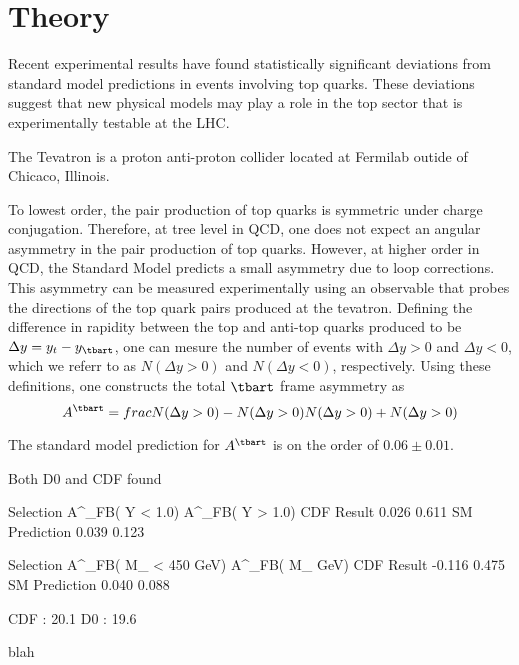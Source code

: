 
%
\section{Theory}








Recent experimental results have found statistically significant deviations from standard model predictions in events involving top quarks.
These deviations suggest that new physical models may play a role in the top sector that is experimentally testable at the LHC.

The Tevatron is a proton anti-proton collider located at Fermilab outide of Chicaco, Illinois.


To lowest order, the pair production of top quarks is symmetric under charge conjugation.
Therefore, at tree level in QCD, one does not expect an angular asymmetry in the pair production of top quarks.
However, at higher order in QCD, the Standard Model predicts a small asymmetry due to loop corrections.
This asymmetry can be measured experimentally using an observable that probes the directions of the top quark pairs produced at the tevatron.
Defining the difference in rapidity between the top and anti-top quarks produced to be $\Delta y = y_{t} - y_{\tbart}$, one can mesure the number of events with $\Delta y>0$ and $\Delta y<0$, which we referr to as $N(\Delta y>0)$ and $N(\Delta y < 0)$, respectively.
Using these definitions, one constructs the total $\tbart$ frame asymmetry as
\begin{equation}
  A^{\tbart} = frac{N(\Delta y>0) - N(\Delta y>0)}{N(\Delta y>0) + N(\Delta y>0)}
\end{equation}

The standard model prediction for $A^{\tbart}$ is on the order of $0.06 \pm 0.01$.%

Both D0 and CDF found 


Selection      A^{\tbart}_{FB}( \Delta Y < 1.0) A^{\tbart}_{FB}( \Delta Y > 1.0)
CDF Result     0.026        0.611 
SM Prediction  0.039        0.123 

Selection      A^{\tbart}_{FB}( M_{\ttbar} < 450 GeV) A^{\tbart}_{FB}( M_{\ttbar}  GeV)
CDF Result     -0.116       0.475 
SM Prediction  0.040        0.088  

CDF : 20.1  
D0 : 19.6  %

blah
